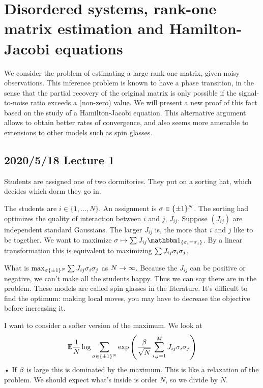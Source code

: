 \section{Disordered systems, rank-one matrix estimation and Hamilton-Jacobi equations}

We consider the problem of estimating a large rank-one matrix, given noisy observations. This inference problem is known to have a phase transition, in the sense that the partial recovery of the original matrix is only possible if the signal-to-noise ratio exceeds a (non-zero) value. We will present a new proof of this fact based on the study of a Hamilton-Jacobi equation. This alternative argument allows to obtain better rates of convergence, and also seems more amenable to extensions to other models such as spin glasses. 

\subsection{2020/5/18 Lecture 1}

Students are assigned one of two dormitories. They put on a sorting hat, which decides which dorm they go in.

The students are $i\in \{1,\ldots, N\}$. An assignment is $\sigma\in \{\pm 1\}^N$. 
The sorting had optimizes the quality of interaction between $i$ and $j$, $J_{ij}$. Suppose $(J_{ij})$ are independent standard Gaussians. The larger $J_{ij}$ is, the more that $i$ and $j$ like to be together. We want to maximize $\si\mapsto \sum J_{ij} \one_{\{\si_i=\si_j\}}$. By a linear transformation this is equivalent to maximizing $\sum J_{ij} \sigma_i\sigma_j$.

What is $\max_{\sigma\{\pm 1\}^N} \sum J_{ij}\sigma_i\sigma_j$ as $N\to \infty$.
Because the $J_{ij}$ can be positive or negative, we can't make all the students happy. Thus we can say there are  in the problem. These models are called spin glasses in the literature.
It's difficult to find the optimum: making local moves, you may have to decrease the objective before increasing it.

I want to consider a softer version of the maximum. We look at 
\begin{align*}
\mathbb{E} \frac{1}{N}\log \sum_{\sigma\in \{\pm 1\}^N}\exp\left( {
\frac{\beta}{\sqrt N}\sum_{i,j=1}^{M} J_{ij} \sigma_i\sigma_j
} \right)
\end{align*}•
If $\beta$ is large this is dominated by the maximum. 
This is like a relaxation of the problem. We should expect what's inside is order $N$, so we divide by $N$.

